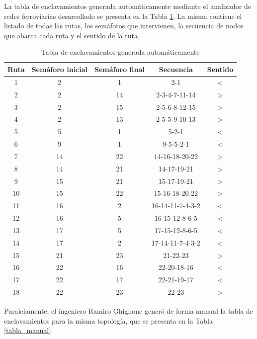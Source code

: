 	La tabla de enclavamientos generada automáticamente mediante el analizador de redes ferroviarias desarrollado se presenta en la Tabla \ref{tabla_script}. La misma contiene el listado de todas las rutas, los semáforos que intervienen, la secuencia de nodos que abarca cada ruta y el sentido de la ruta.
	
	\begin{table}[!hbt]
	\caption{Tabla de enclavamientos generada automáticamente}
	\label{tabla_script}
	\centering
	\begin{tabular}{ c  c  c  c  c }
	\hline
	Ruta & Semáforo inicial & Semáforo final & Secuencia & Sentido \\	
	\hline
		1 & 2 & 1 & 2-1 & < \\
		2 & 2 & 14 & 2-3-4-7-11-14 & > \\
		3 & 2 & 15 & 2-5-6-8-12-15 & > \\
		4 & 2 & 13 & 2-5-5-9-10-13 & > \\
		5 & 5 & 1 & 5-2-1 & < \\
		6 & 9 & 1 & 9-5-5-2-1 & < \\
		7 & 14 & 22 & 14-16-18-20-22 & > \\
		8 & 14 & 21 & 14-17-19-21 & > \\
		9 & 15 & 21 & 15-17-19-21 & > \\
		10 & 15 & 22 & 15-16-18-20-22 & > \\
		11 & 16 & 2 & 16-14-11-7-4-3-2 & < \\
		12 & 16 & 5 & 16-15-12-8-6-5 & < \\
		13 & 17 & 5 & 17-15-12-8-6-5 & < \\
		14 & 17 & 2 & 17-14-11-7-4-3-2 & < \\
		15 & 21 & 23 & 21-22-23 & > \\
		16 & 22 & 16 & 22-20-18-16 & < \\
		17 & 22 & 17 & 22-21-19-17 & < \\
		18 & 22 & 23 & 22-23 & > \\
	\end{tabular}
	\end{table}		
	
	Paralelamente, el ingeniero Ramiro Ghignone generó de forma manual la tabla de enclavamientos para la misma topología, que se presenta en la Tabla \ref{tabla_manual}.
	 
